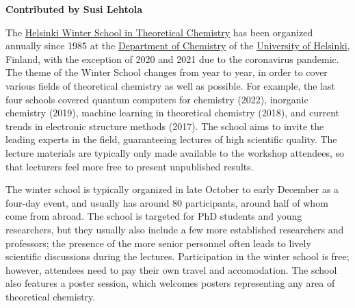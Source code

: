 \textbf{Contributed by Susi Lehtola}

The \href{http://www.chem.helsinki.fi/ws.html}{Helsinki Winter School in
Theoretical Chemistry} has been organized annually
since 1985 at the \href{http://www.chem.helsinki.fi/}{Department of Chemistry}
of the \href{www.helsinki.fi/}{University of Helsinki}, Finland, with the
exception of 2020 and 2021 due to the coronavirus pandemic. The theme of the
Winter School changes from year to year, in order to cover various fields of
theoretical chemistry as well as possible. For example, the last four schools
covered quantum computers for chemistry (2022), inorganic chemistry (2019),
machine learning in theoretical chemistry (2018), and current trends in
electronic structure methods (2017). The school aims to invite the leading 
experts in the field, guaranteeing lectures of high scientific quality. The
lecture materials are typically only made available to the workshop attendees,
so that lecturers feel more free to present unpublished results.

The winter school is typically organized in late October to early December as a
four-day event, and usually has around 80 participants, around half of whom come
from abroad. The school is targeted for PhD students and young researchers, but
they usually also include a few more established researchers and professors; the
presence of the more senior personnel often leads to lively scientific
discussions during the lectures. Participation in the winter school is free;
however, attendees need to pay their own travel and accomodation. The school
also features a poster session, which welcomes posters representing any area of
theoretical chemistry.
